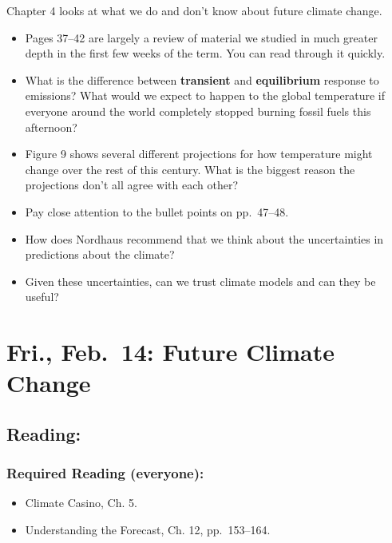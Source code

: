 \documentclass[
]{article}
\providecommand{\tightlist}{%
  \setlength{\itemsep}{0pt}\setlength{\parskip}{0pt}}
\newcommand{\COO}{\ce{CO2}}
\begin{document}
Chapter 4 looks at what we do and don't know about future climate
change.

\begin{itemize}
\tightlist
\item
  Pages 37--42 are largely a review of material we studied in much
  greater depth in the first few weeks of the term. You can read through
  it quickly.
\item
  What is the difference between \textbf{transient} and
  \textbf{equilibrium} response to \COO emissions? What would we expect
  to happen to the global temperature if everyone around the world
  completely stopped burning fossil fuels this afternoon?
\item
  Figure 9 shows several different projections for how temperature might
  change over the rest of this century. What is the biggest reason the
  projections don't all agree with each other?
\item
  Pay close attention to the bullet points on pp.~47--48.
\item
  How does Nordhaus recommend that we think about the uncertainties in
  predictions about the climate?
\item
  Given these uncertainties, can we trust climate models and can they be
  useful?
\end{itemize}

\hypertarget{fri.-feb.-14-future-climate-change}{%
\section{Fri., Feb.~14: Future Climate
Change}\label{fri.-feb.-14-future-climate-change}}

\hypertarget{reading-16}{%
\subsection{Reading:}\label{reading-16}}

\hypertarget{required-reading-everyone-13}{%
\subsubsection{Required Reading
(everyone):}\label{required-reading-everyone-13}}

\begin{itemize}
\tightlist
\item
  Climate Casino, Ch. 5.
\item
  Understanding the Forecast, Ch. 12, pp.~153--164.
\end{itemize}
\end{document}
